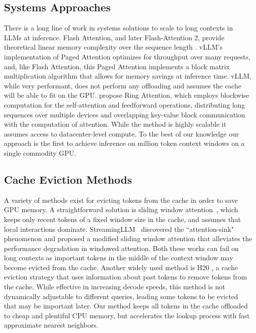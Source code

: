 \subsection{Systems Approaches}
There is a long line of work in systems solutions to scale to long contexts in LLMs at inference. Flash Attention, and later Flash-Attention 2, provide theoretical linear memory complexity over the sequence length \citep{dao2022flashattentionfastmemoryefficientexact, dao2024flashattention}. 
vLLM's implementation of Paged Attention \citep{kwon2023efficient} optimizes for throughput over many requests, and, like Flash Attention, this Paged Attention implements a block matrix multiplication algorithm that allows for memory savings at inference time. vLLM, while very performant, does not perform any offloading and assumes the cache will be able to fit on the GPU.
\citet{liu2023ringattentionblockwisetransformers} propose Ring Attention, which employs blockwise computation for the self-attention and feedforward operations, distributing long sequences over multiple devices and overlapping key-value block communication with the computation of attention. While the method is highly scalable it assumes access to datacenter-level compute. To the best of our knowledge our approach is the first to achieve inference on million token context windows on a single commodity GPU. 

\subsection{Cache Eviction Methods}
A variety of methods exist for evicting tokens from the cache in order to save GPU memory. A straightforward solution is sliding window attention~\citep{longformer}, which keeps only recent tokens of a fixed window size in the cache, and assumes that local interactions dominate. StreamingLLM~\citep{streamingllm} discovered the ``attention-sink" phenomenon and proposed a modified sliding window attention that alleviates the performance degradation in windowed attention. Both these works can fail on long contexts as important tokens in the middle of the context window may become evicted from the cache. Another widely used method is H20 \citep{zhang2023h2oheavyhitteroracleefficient}, a cache eviction strategy that uses information about past tokens to remove tokens from the cache. While effective in increasing decode speeds, this method is not dynamically adjustable to different queries, leading some tokens to be evicted that may be important later. Our method keeps all tokens in the cache offloaded to cheap and plentiful CPU memory, but accelerates the lookup process with fast approximate nearest neighbors.


